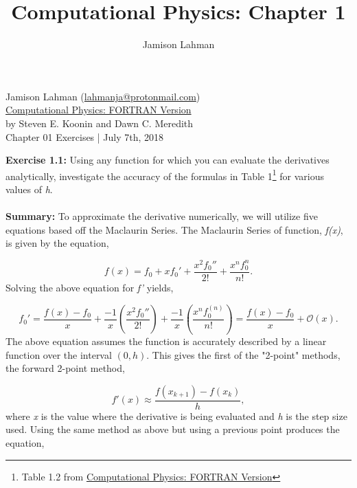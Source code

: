 \documentclass[10pt]{article}
\author{Jamison Lahman}
\title{Computational Physics: Chapter 1}
\begin{document}
\begin{flushright}Jamison Lahman (\href{mailto:lahmanja@protonmail.com}{lahmanja@protonmail.com}) \\
\href{https://www.amazon.com/Computational-Physics-Fortran-Steven-Koonin/dp/0201386232}{Computational Physics: FORTRAN Version} \\
by Steven E. Koonin and Dawn C. Meredith\\
Chapter 01 Exercises | July 7th, 2018 \\
\end{flushright}
\label{exercise:1.1}\textbf{Exercise 1.1:} Using any function for which you can evaluate the derivatives analytically, investigate the accuracy of the formulas in Table 1\footnote{Table 1.2 from \href{https://www.amazon.com/Computational-Physics-Fortran-Steven-Koonin/dp/0201386232}{Computational Physics: FORTRAN Version}} for various values of \textit{h}. \\
\\
\label{summary:1.1}\textbf{Summary:} To approximate the derivative numerically, we will utilize five equations based off the Maclaurin Series. The Maclaurin Series of function, \textit{f(x)}, is given by the equation,

\begin{equation}
	f(x) = f_0 +x f_0'+ \frac{x^2f_0''}{2!} + \frac{x^nf_0^{n}}{n!}.
\end{equation}
Solving the above equation for \textit{f'} yields,

\begin{equation}
	f_0' = \frac{f(x)-f_0}{x}+\frac{-1}{x}\left(\frac{x^2f_0''}{2!} \right)+ \frac{-1}{x} \left(\frac{x^nf_0^{(n)}}{n!}\right) =  \frac{f(x)-f_0}{x}  + \mathcal{O}(x).
\end{equation}
The above equation assumes the function is accurately described by a linear function over the interval $(0,h)$. This gives the first of the "2-point" methods, the forward 2-point method,

\begin{equation}
\label{eq:forward2}
	f'(x) \approx \frac{f(x_{k+1})-f(x_k)}{h},
\end{equation}
where \textit{x} is the value where the derivative is being evaluated and \textit{h} is the step size used. Using the same method as above but using a previous point produces the equation,
\end{document}
